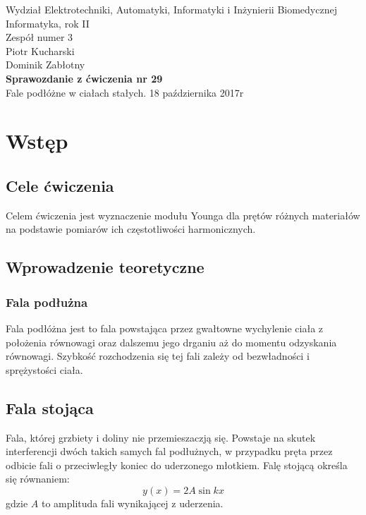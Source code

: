 \documentclass[a4paper,12pts]{article}
\begin{document}
	\thispagestyle{empty}
	\begin{flushleft}
		Wydział Elektrotechniki, Automatyki, Informatyki i Inżynierii Biomedycznej \\
		Informatyka, rok II \\
		Zespół numer 3 \\
		Piotr Kucharski \\
		Dominik Zabłotny \\
		\vspace*{\fill}
		{\large \textbf{Sprawozdanie z ćwiczenia nr 29} } \\
		Fale podłóżne w ciałach stałych.	
		\vfill	
		18 października 2017r
	\end{flushleft}
	
	\newpage
	

\section{Wstęp}

\subsection{Cele ćwiczenia}
Celem ćwiczenia jest wyznaczenie modułu Younga dla prętów różnych materiałów na podstawie pomiarów ich częstotliwości harmonicznych.

\subsection{Wprowadzenie teoretyczne}
\subsubsection{Fala podłużna}
Fala podłóżna jest to fala powstająca przez gwałtowne wychylenie ciała z położenia równowagi oraz dalszemu jego drganiu aż do momentu odzyskania równowagi. Szybkość rozchodzenia się tej fali zależy od bezwładności i sprężystości ciała.

\subsection{Fala stojąca}
Fala, której grzbiety i doliny nie przemieszaczją się. Powstaje na skutek interferencji dwóch takich samych fal podłużnych, w przypadku pręta przez odbicie fali o przeciwległy koniec do uderzonego młotkiem. Falę stojącą określa się równaniem:
\begin{equation}
y(x) = 2A \sin kx
\end{equation}
gdzie $A$ to amplituda fali wynikającej z uderzenia.
\end{document}
